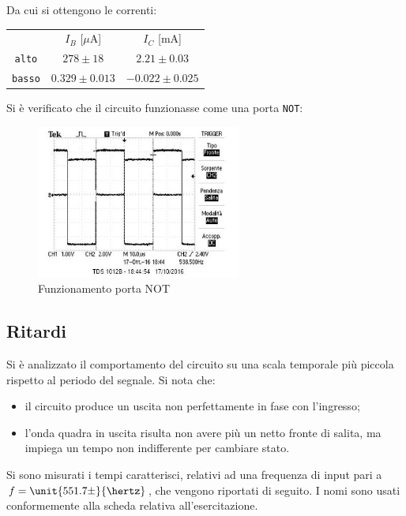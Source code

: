 \documentclass[10pt,a4paper]{article}
\def\code#1{\texttt{#1}}
\begin{document}
Da cui si ottengono le correnti:
\begin{table}[h!]
\centering
\begin{tabular}{c|c|c}
 & $I_B$ [$\mu$A]& $I_C$ [mA]\\
\code{alto} & $278 \pm 18$ & $2.21 \pm 0.03$\\
\code{basso} & $0.329 \pm  0.013$ & $-0.022 \pm 0.025$
\end{tabular}
\end{table}

Si è verificato che il circuito funzionasse come una porta \code{NOT}:

\begin{figure}[h!]
	\centering
	\includegraphics[width=0.6\textwidth]{../oscilloscopio/not_tarocco.jpg}
	\caption{Funzionamento porta NOT}
\end{figure}

\subsection{Ritardi}
Si è analizzato il comportamento del circuito su una scala temporale più piccola rispetto al periodo del segnale. Si nota che:
\begin{itemize}
\item il circuito produce un uscita non perfettamente in fase con l'ingresso;
\item l'onda quadra in uscita risulta non avere più un netto fronte di salita, ma impiega un tempo non indifferente per cambiare stato.
\end{itemize}

Si sono misurati i tempi caratterisci, relativi ad una frequenza di input pari a $f = \unit{551.7 \pm}{\hertz}$, che vengono riportati di seguito. I nomi sono usati conformemente alla scheda relativa all'esercitazione. 
\end{document}
